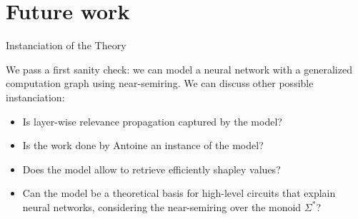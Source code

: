 \documentclass[11pt]{beamer}
\begin{document}
\section{Future work}
\begin{frame}{Instanciation of the Theory}

We pass a first sanity check: we can model a neural network with a generalized computation graph using near-semiring. We can discuss other possible instanciation:

\begin{itemize}

	\item Is layer-wise relevance propagation captured by the model?
	
	\item Is the work done by Antoine an instance of the model?
	
	\item Does the model allow to retrieve efficiently shapley values?
	
	\item Can the model be a theoretical basis for high-level circuits that explain neural networks, considering the near-semiring over the monoid $\Sigma^*$?

\end{itemize}




\end{frame}
\end{document}

